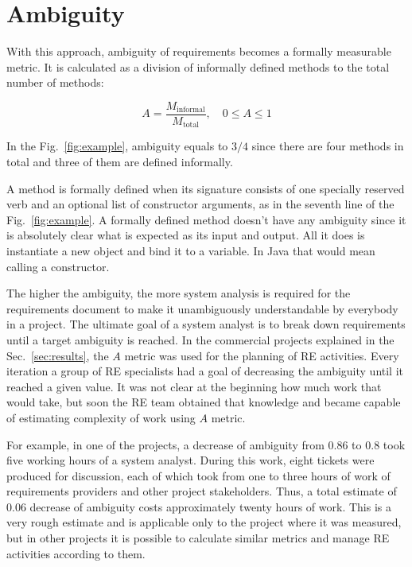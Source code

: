 \documentclass[sigplan,10pt,nonacm=true]{acmart}
\begin{document}
\section{Ambiguity}
\label{sec:ambiguity}

With this approach, ambiguity of requirements becomes a formally measurable metric.
It is calculated as a division of informally defined methods to the total
number of methods:

\begin{equation}
A = \frac{M_{\mbox{informal}}}{M_{\mbox{total}}},\quad 0 \le A \le 1
\end{equation}

In the Fig.~\ref{fig:example}, ambiguity equals to $3/4$ since there are four
methods in total and three of them are defined informally.

A method is formally defined when its signature consists of one specially
reserved verb  and an optional list of constructor arguments,
as in the seventh line of the Fig.~\ref{fig:example}. A formally defined
method doesn't have any ambiguity since it is absolutely clear what is
expected as its input and output. All it does is instantiate a new object
and bind it to a variable. In Java that would mean calling a constructor.

The higher the ambiguity, the more system analysis is required for the
requirements document to make it unambiguously understandable by everybody
in a project. The ultimate goal of a system analyst is to break down
requirements until a target ambiguity is reached. In the commercial projects
explained in the Sec.~\ref{sec:results}, the $A$ metric was used for the planning
of RE activities. Every iteration a group of RE specialists had a goal of
decreasing the ambiguity until it reached a given value. It was not clear at
the beginning how much work that would take, but soon the RE team
obtained that knowledge and became capable of estimating
complexity of work using $A$ metric.

For example, in one of the projects, a decrease of ambiguity from $0.86$ to
$0.8$ took five working hours of a system analyst. During this work, eight
tickets were produced for discussion, each of which took from one to three
hours of work of requirements providers and other project stakeholders.
Thus, a total estimate of 0.06 decrease of ambiguity costs approximately
twenty hours of work. This is a very rough estimate and is applicable only
to the project where it was measured, but in other projects it is possible
to calculate similar metrics and manage RE activities according to them.
\end{document}
